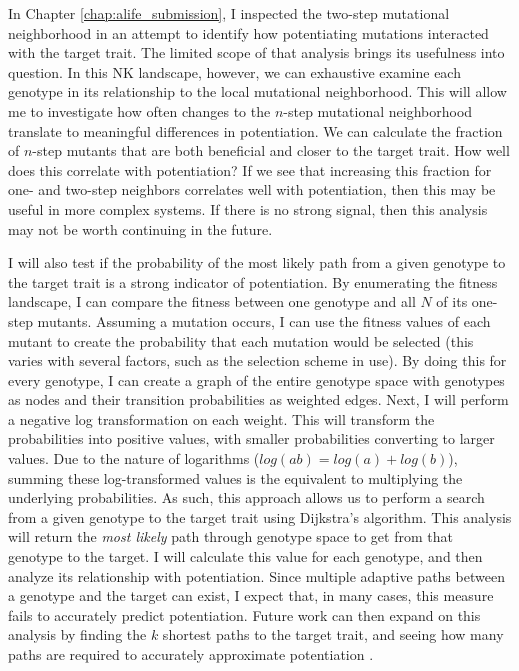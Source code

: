 In Chapter \ref{chap:alife_submission}, I inspected the two-step mutational neighborhood in an attempt to identify how potentiating mutations interacted with the target trait. 
The limited scope of that analysis brings its usefulness into question. 
In this NK landscape, however, we can exhaustive examine each genotype in its relationship to the local mutational neighborhood. 
This will allow me to investigate how often changes to the $n$-step mutational neighborhood translate to meaningful differences in potentiation. 
We can calculate the fraction of $n$-step mutants that are both beneficial and closer to the target trait. 
How well does this correlate with potentiation? 
If we see that increasing this fraction for one- and two-step neighbors correlates well with potentiation, then this may be useful in more complex systems. 
If there is no strong signal, then this analysis may not be worth continuing in the future. 

I will also test if the probability of the most likely path from a given genotype to the target trait is a strong indicator of potentiation. 
By enumerating the fitness landscape, I can compare the fitness between one genotype and all $N$ of its one-step mutants. 
Assuming a mutation occurs, I can use the fitness values of each mutant to create the probability that each mutation would be selected (this varies with several factors, such as the selection scheme in use). 
By doing this for every genotype, I can create a graph of the entire genotype space with genotypes as nodes and their transition probabilities as weighted edges. 
Next, I will perform a negative log transformation on each weight. 
This will transform the probabilities into positive values, with smaller probabilities converting to larger values. 
Due to the nature of logarithms ($log(ab) = log(a) + log(b)$), summing these log-transformed values is the equivalent to multiplying the underlying probabilities. 
As such, this approach allows us to perform a search from a given genotype to the target trait using Dijkstra's algorithm. 
This analysis will return the \textit{most likely} path through genotype space to get from that genotype to the target. 
I will calculate this value for each genotype, and then analyze its relationship with potentiation. 
Since multiple adaptive paths between a genotype and the target can exist, I expect that, in many cases, this measure fails to accurately predict potentiation. 
Future work can then expand on this analysis by finding the $k$ shortest paths to the target trait, and seeing how many paths are required to accurately approximate potentiation \citep{eppsteinFindingShortestPaths1998}. 


